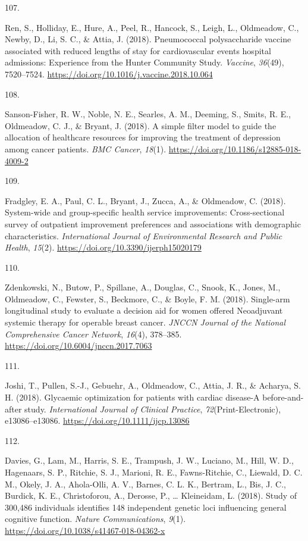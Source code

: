 \documentclass[11pt, a4paper]{awesome-cv}
\newlength{\csllabelwidth}
\newcommand{\CSLLeftMargin}[1]{\parbox[t]{\csllabelwidth}{#1}}
\newcommand{\CSLRightInline}[1]{\parbox[t]{\linewidth - \csllabelwidth}{#1}}
\begin{document}
\leavevmode\hypertarget{ref-ren_pneumococcal_2018}{}%
\CSLLeftMargin{107. }
\CSLRightInline{Ren, S., Holliday, E., Hure, A., Peel, R., Hancock, S.,
Leigh, L., Oldmeadow, C., Newby, D., Li, S. C., \& Attia, J. (2018).
Pneumococcal polysaccharide vaccine associated with reduced lengths of
stay for cardiovascular events hospital admissions: Experience from the
Hunter Community Study. \emph{Vaccine}, \emph{36}(49), 7520--7524.
\url{https://doi.org/10.1016/j.vaccine.2018.10.064}}

\leavevmode\hypertarget{ref-sanson-fisher_simple_2018}{}%
\CSLLeftMargin{108. }
\CSLRightInline{Sanson-Fisher, R. W., Noble, N. E., Searles, A. M.,
Deeming, S., Smits, R. E., Oldmeadow, C. J., \& Bryant, J. (2018). A
simple filter model to guide the allocation of healthcare resources for
improving the treatment of depression among cancer patients. \emph{BMC
Cancer}, \emph{18}(1). \url{https://doi.org/10.1186/s12885-018-4009-2}}

\leavevmode\hypertarget{ref-fradgley_system-wide_2018}{}%
\CSLLeftMargin{109. }
\CSLRightInline{Fradgley, E. A., Paul, C. L., Bryant, J., Zucca, A., \&
Oldmeadow, C. (2018). System-wide and group-specific health service
improvements: Cross-sectional survey of outpatient improvement
preferences and associations with demographic characteristics.
\emph{International Journal of Environmental Research and Public
Health}, \emph{15}(2). \url{https://doi.org/10.3390/ijerph15020179}}

\leavevmode\hypertarget{ref-zdenkowski_single-arm_2018}{}%
\CSLLeftMargin{110. }
\CSLRightInline{Zdenkowski, N., Butow, P., Spillane, A., Douglas, C.,
Snook, K., Jones, M., Oldmeadow, C., Fewster, S., Beckmore, C., \&
Boyle, F. M. (2018). Single-arm longitudinal study to evaluate a
decision aid for women offered Neoadjuvant systemic therapy for operable
breast cancer. \emph{JNCCN Journal of the National Comprehensive Cancer
Network}, \emph{16}(4), 378--385.
\url{https://doi.org/10.6004/jnccn.2017.7063}}

\leavevmode\hypertarget{ref-joshi_glycaemic_2018}{}%
\CSLLeftMargin{111. }
\CSLRightInline{Joshi, T., Pullen, S.-J., Gebuehr, A., Oldmeadow, C.,
Attia, J. R., \& Acharya, S. H. (2018). Glycaemic optimization for
patients with cardiac disease-A before-and-after study.
\emph{International Journal of Clinical Practice},
\emph{72}(Print-Electronic), e13086--e13086.
\url{https://doi.org/10.1111/ijcp.13086}}

\leavevmode\hypertarget{ref-davies_study_2018}{}%
\CSLLeftMargin{112. }
\CSLRightInline{Davies, G., Lam, M., Harris, S. E., Trampush, J. W.,
Luciano, M., Hill, W. D., Hagenaars, S. P., Ritchie, S. J., Marioni, R.
E., Fawns-Ritchie, C., Liewald, D. C. M., Okely, J. A., Ahola-Olli, A.
V., Barnes, C. L. K., Bertram, L., Bis, J. C., Burdick, K. E.,
Christoforou, A., Derosse, P., \ldots{} Kleineidam, L. (2018). Study of
300,486 individuals identifies 148 independent genetic loci influencing
general cognitive function. \emph{Nature Communications}, \emph{9}(1).
\url{https://doi.org/10.1038/s41467-018-04362-x}}
\end{document}
